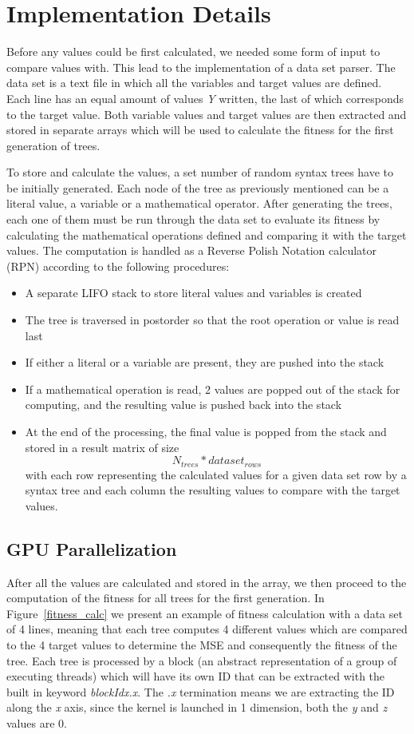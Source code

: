 \documentclass[runningheads]{llncs}
\begin{document}
\section{Implementation Details}
Before any values could be first calculated, we needed some form of input to compare values with. This lead to the implementation of a data set parser. The data set is a text file in which all the variables and target values are defined. Each line has an equal amount of values \textit{Y} written, the last of which corresponds to the target value. Both variable values and target values are then extracted and stored in separate arrays which will be used to calculate the fitness for the first generation of trees.

To store and calculate the values, a set number of random syntax trees have to be initially generated. Each node of the tree as previously mentioned can be a literal value, a variable or a mathematical operator. After generating the trees, each one of them must be run through the data set to evaluate its fitness by calculating the mathematical operations defined and comparing it with the target values. The computation is handled as a Reverse Polish Notation calculator (RPN) according to the following procedures:
\begin{itemize}
	\item A separate LIFO stack to store literal values and variables is created
	\item The tree is traversed in postorder so that the root operation or value is read last
	\item If either a literal or a variable are present, they are pushed into the stack
	\item If a mathematical operation is read, 2 values are popped out of the stack for computing, and the resulting value is pushed back into the stack
	\item At the end of the processing, the final value is popped from the stack and stored in a result matrix of size $$N_{trees}*dataset_{rows}$$ with each row representing the calculated values for a given data set row by a syntax tree and each column the resulting values to compare with the target values.
\end{itemize}

\subsection{GPU Parallelization}
After all the values are calculated and stored in the array, we then proceed to the computation of the fitness for all trees for the first generation. In Figure~\ref{fitness_calc} we present an example of fitness calculation with a data set of 4 lines, meaning that each tree computes 4 different values which are compared to the 4 target values to determine the MSE and consequently the fitness of the tree. Each tree is processed by a block (an abstract representation of a group of executing threads) which will have its own ID that can be extracted with the built in keyword \textit{blockIdx.x}. The \textit{.x} termination means we are extracting the ID along the \textit{x} axis, since the kernel is launched in 1 dimension, both the \textit{y} and \textit{z} values are 0.
\end{document}
